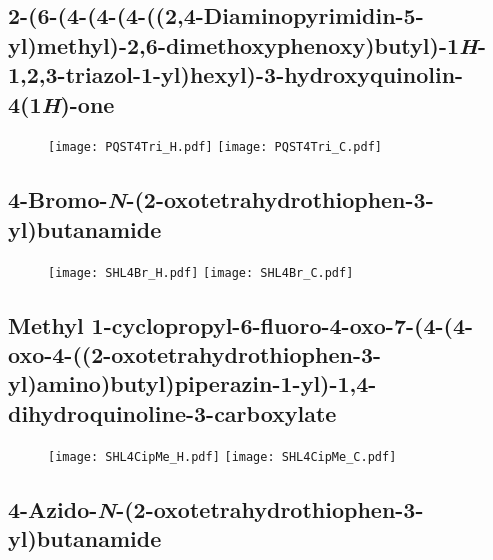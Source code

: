 \subsection{2-(6-(4-(4-(4-((2,4-Diaminopyrimidin-5-yl)methyl)-2,6-dimethoxyphenoxy)butyl)-1\textit{H}-1,2,3-triazol-1-yl)hexyl)-3-hydroxyquinolin-4(1\textit{H})-one }

\begin{figure}[H]
	\centering
		\texttt{[image: PQST4Tri\_H.pdf]}
		\texttt{[image: PQST4Tri\_C.pdf]}
\end{figure}


\subsection{4\hyp{}Bromo\hyp{}\textit{N}\hyp{}(2\hyp{}oxotetrahydrothiophen\hyp{}3\hyp{}yl)butanamide }

\begin{figure}[H]
	\centering
		\texttt{[image: SHL4Br\_H.pdf]}
		\texttt{[image: SHL4Br\_C.pdf]}
\end{figure}

\subsection{Methyl 1\hyp{}cyclopropyl\hyp{}6\hyp{}fluoro\hyp{}4\hyp{}oxo\hyp{}7\hyp{}(4\hyp{}(4\hyp{}oxo\hyp{}4\hyp{}((2\hyp{}oxotetrahydrothiophen\hyp{}3\hyp{}yl)amino)butyl)pip\allowbreak erazin\hyp{}1\hyp{}yl)\hyp{}1,4\hyp{}dihydroquinoline\hyp{}3\hyp{}carboxylate }

\begin{figure}[H]
	\centering
		\texttt{[image: SHL4CipMe\_H.pdf]}
		\texttt{[image: SHL4CipMe\_C.pdf]}
\end{figure}

\subsection{4\hyp{}Azido\hyp{}\textit{N}\hyp{}(2\hyp{}oxotetrahydrothiophen\hyp{}3\hyp{}yl)butanamide }

